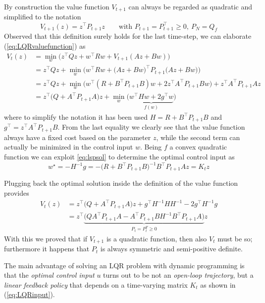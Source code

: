 	By construction the value function $V_{t+1}$ can always be regarded as quadratic and simplified to the notation
	\[ V_{t+1}(z) = z^\top  P_{t+1}z \qquad \textrm{with } P_{t+1} = P_{t+1}^\top  \geq 0,\ P_N = Q_f \]
	Observed that this definition surely holds for the last time-step, we can elaborate (\ref{eq:LQRvaluefunction}) as
	\begin{align*}
		V_t(z) & = \min_w \big(z^\top  Q z + w^\top Rw + V_{t+1}(Az+Bw)\big) \\
		& = z^\top  Q z + \min_w \Big(w^\top Rw + \big(Az + Bw\big)^\top  P_{t+1}\big(Az + Bw\big)\Big) \\
		& = z^\top Q z + \min_w\big(w^\top(R + B^\top P_{t+1}B)w + 2z^\top A^\top P_{t+1}Bw\big) + z^\top A^\top P_{t+1} A z \\
		& = z^\top\big(Q + A^\top P_{t+1}A\big) z + \min_w \big(\underbrace{w^\top H w + 2 g^\top w}_{f(w)}\big)
	\end{align*}
	where to simplify the notation it has been used $H = R + B^\top P_{t+1}B$ and $g^\top = z^\top A^\top P_{t+1} B$. From the last equality we clearly see that the value function always have a fixed cost based on the parameter $z$, while the second term can actually be minimized in the control input $w$. Being $f$ a convex quadratic function we can exploit \ref{eq:lspsol} to determine the optimal control input as
	\begin{equation} \label{eq:LQRinput}
		w^\star = -H^{-1} g = - \big(R + B^\top P_{t+1} B\big)^{-1} B^\top P_{t+1}A z = K_t z
	\end{equation}
	
	Plugging back the optimal solution inside the definition of the value function provides
	\begin{equation}
	\begin{aligned}
		V_t(z) & = z^\top \big(Q + A^\top P_{t+1}A\big) z + g^\top H^{-1} HH^{-1} - 2g^\top H^{-1}g \\
		& = z^\top \underbrace{\big(QA^\top P_{t+1} A - A^\top P_{t+1}BH^{-1}B^\top P_{t+1}A\big)}_{P_t=P_t^T \geq 0} z
	\end{aligned}
	\end{equation}
	With this we proved that if $V_{t+1}$ is a quadratic function, then also $V_t$ must be so; furthermore it happens that $P_t$ is always symmetric and semi-positive definite. 
	
	The main advantage of solving an LQR problem with dynamic programming is that the \textit{optimal control input} $u$ turns out to be not an \textit{open-loop trajectory}, but a \textit{linear feedback policy} that depends on a time-varying matrix $K_t$ as shown in (\ref{eq:LQRinput}).
	
